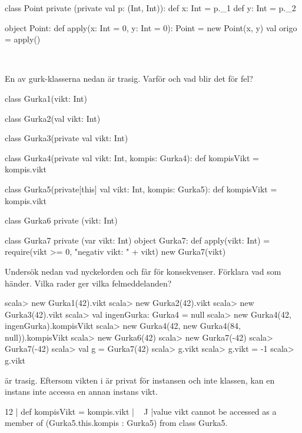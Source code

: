\SubtaskSolved

\begin{Code}
class Point private (private val p: (Int, Int)):
    def x: Int = p._1
    def y: Int = p._2

object Point:
    def apply(x: Int = 0, y: Int = 0): Point = new Point(x, y)
    val origo = apply()
\end{Code}

\QUESTEND




\QUESTBEGIN

\Task  \what~

\Subtask En av gurk-klasserna nedan är trasig. Varför och vad blir det för fel?

\begin{Code}
class Gurka1(vikt: Int)

class Gurka2(val vikt: Int)

class Gurka3(private val vikt: Int)

class Gurka4(private val vikt: Int, kompis: Gurka4):
    def kompisVikt = kompis.vikt

class Gurka5(private[this] val vikt: Int, kompis: Gurka5):
    def kompisVikt = kompis.vikt

class Gurka6 private (vikt: Int)

class Gurka7 private (var vikt: Int)
object Gurka7:
    def apply(vikt: Int) =
        require(vikt >= 0, "negativ vikt: " + vikt)
        new Gurka7(vikt)
\end{Code}

\Subtask Undersök nedan vad nyckelorden  och  får för konsekvenser. Förklara vad som händer. Vilka rader ger vilka felmeddelanden?

\begin{REPL}
scala> new Gurka1(42).vikt
scala> new Gurka2(42).vikt
scala> new Gurka3(42).vikt
scala> val ingenGurka: Gurka4 = null
scala> new Gurka4(42, ingenGurka).kompisVikt
scala> new Gurka4(42, new Gurka4(84, null)).kompisVikt
scala> new Gurka6(42)
scala> new Gurka7(-42)
scala> Gurka7(-42)
scala> val g = Gurka7(42)
scala> g.vikt
scala> g.vikt = -1
scala> g.vikt
\end{REPL}


\SOLUTION


\TaskSolved \what

\SubtaskSolved {} är trasig. Eftersom vikten i  är privat för instansen och inte klassen, kan en instans inte accessa en annan instans vikt.
\begin{REPL}
12 |    def kompisVikt = kompis.vikt
   |                     ^^^^^^^^^^^
   |value vikt cannot be accessed as a member of (Gurka5.this.kompis : Gurka5) from class Gurka5.
\end{REPL}


